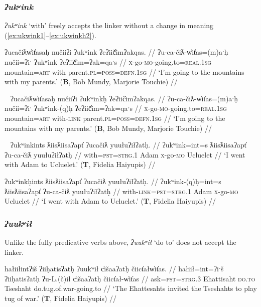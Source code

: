 \subsubsection{\textit{ʔukʷink}} \label{ch:link:ukwink} \textit{ʔukʷink} `with' freely accepts the linker without a change in meaning (\ref{ex:ukwink1}--\ref{ex:ukwinkh2}).

\ex \label{ex:ukwink1}
\begingl
\glpreamble ʔucačiƛw̓it̓asaḥ nučiiʔi ʔukʷink ʔeʔiič̓imʔakqas. //
\gla ʔu-ca-čiƛ-w̓it̓as=(m)aˑḥ nučii=ʔiˑ ʔukʷink ʔeʔiič̓im=ʔak=qaˑs //
\glb \textsc{x}-go-\textsc{mo}-going.to=\textsc{real.1sg} mountain=\textsc{art} with parent.\textsc{pl}=\textsc{poss}=\textsc{defn.1sg} //
\glft `I'm going to the mountains with my parents.' (\textbf{B}, Bob Mundy, Marjorie Touchie) //
\endgl
\xe

\ex~ \label{ex:ukwinkh1}
\begingl
\glpreamble ʔucačiƛw̓it̓asaḥ nučiiʔi ʔukʷinkḥ ʔeʔiič̓imʔakqas. //
\gla ʔu-ca-čiƛ-w̓it̓as=(m)aˑḥ nučii=ʔiˑ ʔukʷink-(q)ḥ ʔeʔiič̓im=ʔak=qaˑs //
\glb \textsc{x}-go-\textsc{mo}-going.to=\textsc{real.1sg} mountain=\textsc{art} with-\textsc{link} parent.\textsc{pl}=\textsc{poss}=\textsc{defn.1sg} //
\glft `I'm going to the mountains with my parents.' (\textbf{B}, Bob Mundy, Marjorie Touchie) //
\endgl
\xe

\ex~ \label{ex:ukwink2}
\begingl
\glpreamble ʔukʷinkints ƛiisƛiisaʔapt̓ ʔucačiƛ yuułuʔiłʔatḥ. //
\gla ʔukʷink=int=s ƛiisƛiisaʔapt̓ ʔu-ca-čiƛ yuułuʔiłʔatḥ //
\glb with=\textsc{pst}=\textsc{strg.1} Adam \textsc{x}-go-\textsc{mo} Ucluelet //
\glft `I went with Adam to Ucluelet.' (\textbf{T}, Fidelia Haiyupis) //
\endgl
\xe

\ex \label{ex:ukwinkh2}
\begingl
\glpreamble ʔukʷinkḥints ƛiisƛiisaʔapt̓ ʔucačiƛ yuułuʔiłʔatḥ. //
\gla ʔukʷink-(q)ḥ=int=s ƛiisƛiisaʔapt̓ ʔu-ca-čiƛ yuułuʔiłʔatḥ //
\glb with-\textsc{link}=\textsc{pst}=\textsc{strg.1} Adam \textsc{x}-go-\textsc{mo} Ucluelet //
\glft `I went with Adam to Ucluelet.' (\textbf{T}, Fidelia Haiyupis) //
\endgl
\xe

\subsubsection{\textit{ʔuukʷił}} \label{ch:link:uukwil} Unlike the fully predicative verbs above, \textit{ʔuukʷił} `do to' does not accept the linker.

\ex \label{ex:tugofwar1}
\begingl
\glpreamble hałiiłintʔiš ʔiiḥatisʔatḥ ʔuukʷił c̓išaaʔatḥ čiict̓ałw̓it̓as. //
\gla hałiił=int=ʔiˑš ʔiiḥatisʔatḥ ʔu-L.(č)ił c̓išaaʔatḥ čiict̓ał-w̓it̓as //
\glb ask=\textsc{pst}=\textsc{strg.3} Ehattisaht \textsc{do.to} Tseshaht do.tug.of.war-going.to //
\glft `The Ehattesahts invited the Tseshahts to play tug of war.' (\textbf{T}, Fidelia Haiyupis) //
\endgl
\xe


